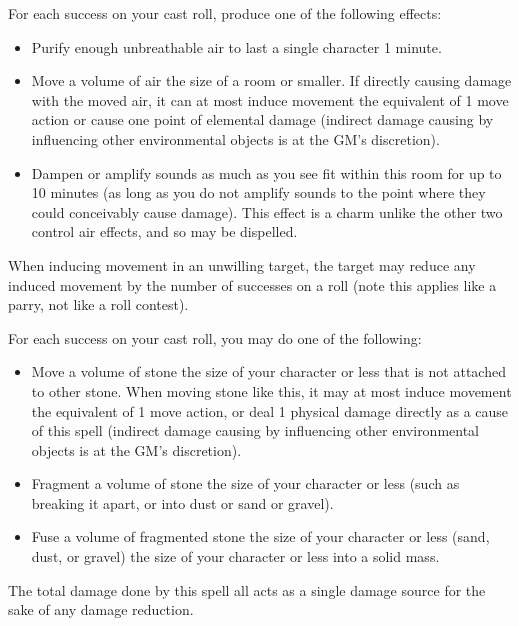 \begin{GRPtablewide}
	\caption{All Casts with a Wt 1 Focus}

	{%
		For each success on your cast roll, produce one of the following effects:
		\begin{itemize}
			\item Purify enough unbreathable air to last a single character 1 minute.
			\item Move a volume of air the size of a room or smaller. If directly causing damage with the moved air, it can at most induce movement the equivalent of 1 move action or cause one point of elemental damage (indirect damage causing by influencing other environmental objects is at the GM's discretion).
			\item Dampen or amplify sounds as much as you see fit within this room for up to 10 minutes (as long as you do not amplify sounds to the point where they could conceivably cause damage). This effect is a charm unlike the other two control air effects, and so may be dispelled.
		\end{itemize}
		When inducing movement in an unwilling target, the target may reduce any induced movement by the number of successes on a  roll (note this applies like a parry, not like a roll contest).
	}

	{%
		For each success on your cast roll, you may do one of the following:
		\begin{itemize}
			\item Move a volume of stone the size of your character or less that is not attached to other stone. When moving stone like this, it may at most induce movement the equivalent of 1 move action, or deal 1 physical damage directly as a cause of this spell (indirect damage causing by influencing other environmental objects is at the GM's discretion).
			\item Fragment a volume of stone the size of your character or less (such as breaking it apart, or into dust or sand or gravel).
			\item Fuse a volume of fragmented stone the size of your character or less (sand, dust, or gravel) the size of your character or less into a solid mass.
		\end{itemize}

		The total damage done by this spell all acts as a single damage source for the sake of any damage reduction.

}
\end{GRPtablewide}
